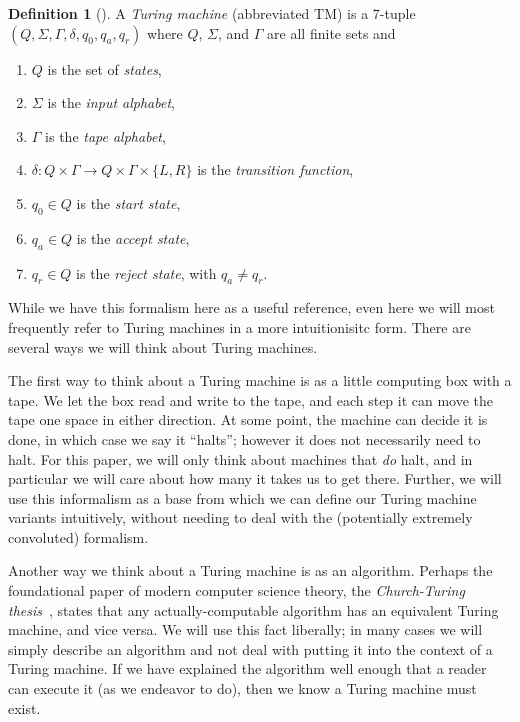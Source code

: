 \documentclass[english,12pt]{reedthesis}
\theoremstyle{plain}
\theoremstyle{definition}
\newtheorem{defn}[defn]{Definition}
\theoremstyle{remark}
\begin{document}
\begin{defn}[{\cite[Def.\ 3.1]{Sip97}}]\label{def:TM}
  A \emph{Turing machine} (abbreviated TM) is a 7-tuple
  $(Q, \Sigma, \Gamma, \delta, q_{0}, q_{a}, q_{r})$ where $Q$, $\Sigma$, and $\Gamma$ are all finite
  sets and
  \begin{enumerate}
    \item $Q$ is the set of \emph{states},
    \item $\Sigma$ is the \emph{input alphabet},
    \item $\Gamma$ is the \emph{tape alphabet},
    \item $\delta\colon Q \times \Gamma \rightarrow Q \times \Gamma \times \{L, R\}$ is the \emph{transition function},
    \item $q_{0} \in Q$ is the \emph{start state},
    \item $q_{a} \in Q$ is the \emph{accept state},
    \item $q_{r} \in Q$ is the \emph{reject state}, with $q_{a} \ne q_{r}$.
  \end{enumerate}
\end{defn}

While we have this formalism here as a useful reference, even here we will most
frequently refer to Turing machines in a more intuitionisitc form. There are
several ways we will think about Turing machines.

The first way to think about a Turing machine is as a little computing box with
a tape. We let the box read and write to the tape, and each step it can move the
tape one space in either direction. At some point, the machine can decide it is
done, in which case we say it ``halts''; however it does not necessarily need to
halt. For this paper, we will only think about machines that \emph{do} halt, and
in particular we will care about how many it takes us to get there. Further, we
will use this informalism as a base from which we can define our Turing machine
variants intuitively, without needing to deal with the (potentially extremely
convoluted) formalism.

Another way we think about a Turing machine is as an algorithm. Perhaps the
foundational paper of modern computer science theory, the \emph{Church-Turing
  thesis}~\cite{Tur36}, states that any actually-computable algorithm has an
equivalent Turing machine, and vice versa. We will use this fact liberally; in
many cases we will simply describe an algorithm and not deal with putting it
into the context of a Turing machine. If we have explained the algorithm well
enough that a reader can execute it (as we endeavor to do), then we know a
Turing machine must exist.
\end{document}
